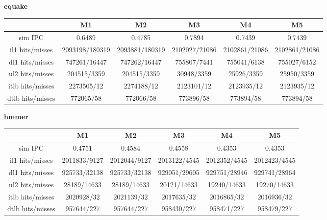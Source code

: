 \documentclass[10pt]{article} %
\begin{document}
\begin{enumerate}
\textbf{equake}
\begin{center}
\begin{tabular}{| c | c | c | c | c | c |}
\hline
 & M1 & M2 & M3 & M4 & M5 \\
\hline
sim IPC & 0.6489 & 0.4785 & 0.7894 & 0.7439 & 0.7439 \\
il1 hits/misses & 2093198/180319 & 2093881/180319 & 2102027/21086 & 2102861/21086 & 2102861/21086 \\
dl1 hits/misses & 747261/16447 & 747262/16447 & 755807/7441 & 755041/6138 & 755027/6152 \\
ul2 hits/misses & 204515/3359 & 204515/3359 & 30948/3359 & 25926/3359 & 25950/3359 \\
itlb hits/misses & 2273505/12 & 2274188/12 & 2123101/12 & 2123935/12 & 2123935/12 \\
dtlb hits/misses & 772065/58 & 772066/58 & 773896/58 & 773894/58 & 773894/58 \\
\hline
\end{tabular}
\end{center}

\textbf{hmmer}
\begin{center}
\begin{tabular}{| c | c | c | c | c | c |}
\hline
 & M1 & M2 & M3 & M4 & M5 \\
\hline
sim IPC & 0.4751 & 0.4584 & 0.4558 & 0.4353 & 0.4353 \\
il1 hits/misses & 2011833/9127 & 2012044/9127 & 2013122/4545 & 2012352/4545 & 2012423/4545 \\
dl1 hits/misses & 925733/32138 & 925733/32138 & 929051/29605 & 929751/28946 & 929741/28964 \\
ul2 hits/misses & 28189/14633 & 28189/14633 & 20121/14633 & 19240/14633 & 19270/14633 \\
itlb hits/misses & 2020928/32 & 2021139/32 & 2017635/32 & 2016865/32 & 2016936/32 \\
dtlb hits/misses & 957644/227 & 957644/227 & 958430/227 & 958471/227 & 958479/227 \\
\hline
\end{tabular}
\end{center}


\end{enumerate}
\end{document}
